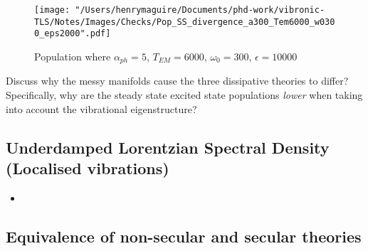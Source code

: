 \documentclass[]{article}
\begin{document}
\begin{figure}[h]
	\centering
	\texttt{[image: "/Users/henrymaguire/Documents/phd-work/vibronic-TLS/Notes/Images/Checks/Pop\_SS\_divergence\_a300\_Tem6000\_w0300\_eps2000".pdf]}
	\caption{Population where $\alpha_{ph}=5$, $T_{EM} =6000$, $\omega_0 = 300$, $\epsilon=10000$}
	\label{}
\end{figure}
Discuss why the messy manifolds cause the three dissipative theories to differ? Specifically, why are the steady state excited state populations \textit{lower} when taking into account the vibrational eigenstructure?

\subsection{Underdamped Lorentzian Spectral Density (Localised vibrations)}
\begin{itemize}
	\item 
\end{itemize}

\begin{comment}
\begin{figure}[h]
	\centering
	\begin{minipage}[b]{0.325\textwidth}
		\texttt{[image: "/Users/henrymaguire/Dropbox/PhD/1st year/DrivenTLS/Images/Underdamped/Populations/w300\_a0p1\_T6000".png]}
		\caption{}
		\label{fig:a0p01_T6000}
	\end{minipage}
	\begin{minipage}[b]{0.325\textwidth}
		\texttt{[image: "/Users/henrymaguire/Dropbox/PhD/1st year/DrivenTLS/Images/Underdamped/Populations/w300\_a200\_T6000".png]}
		\caption{}
		\label{fig:a100_T6000}
	\end{minipage}
	\begin{minipage}[b]{0.325\textwidth}
		\texttt{[image: "/Users/henrymaguire/Dropbox/PhD/1st year/DrivenTLS/Images/Underdamped/Populations/w30\_a200\_T6000".png]}
		\caption{}
		\label{fig:a500_T6000}
	\end{minipage}
\end{figure}
\end{comment}
\subsection{Equivalence of non-secular and secular theories}
\end{document}
